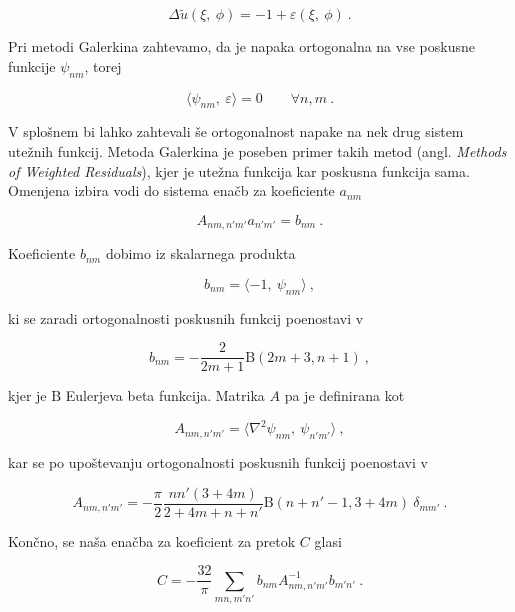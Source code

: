 \documentclass[a4paper]{article}
\begin{document}
\begin{equation}
    \Delta \tilde{u}(\xi,\>\phi) = -1 + \varepsilon(\xi,\>\phi)\>.
\end{equation}

Pri metodi Galerkina zahtevamo, da je napaka ortogonalna na vse poskusne funkcije $\psi_{nm}$, torej

\begin{equation}
    \langle \psi_{nm},\>\varepsilon \rangle = 0 \qquad \forall n,m\>.
\end{equation}

V splošnem bi lahko zahtevali še ortogonalnost napake na nek drug sistem utežnih funkcij. Metoda Galerkina je
poseben primer takih metod (angl. \textit{Methods of Weighted Residuals}), kjer je utežna funkcija kar poskusna
funkcija sama. Omenjena izbira vodi do sistema enačb za koeficiente $a_{nm}$

\begin{equation}
    {A_{nm,n'm'} a_{n'm'}} = b_{nm}\>.
\end{equation}

Koeficiente $b_{nm}$ dobimo iz skalarnega produkta

\begin{equation}
    b_{nm} = \langle -1,\>\psi_{nm} \rangle\>,
\end{equation}

ki se zaradi ortogonalnosti poskusnih funkcij poenostavi v

\begin{equation}
    b_{nm} = - \frac{2}{2m + 1} \mathrm{B}(2m+3, n+1)\>,
\end{equation}

kjer je $\mathrm{B}$ Eulerjeva beta funkcija. Matrika $A$ pa je definirana kot 

\begin{equation}
    A_{nm,n'm'} = \langle \nabla^2\psi_{nm},\>\psi_{n'm'} \rangle\>,
\end{equation}

kar se po upoštevanju ortogonalnosti poskusnih funkcij poenostavi v

\begin{equation}
    A_{nm,n'm'} = -\frac{\pi}{2} \frac{nn'(3+4m)}{2+4m+n+n'} \mathrm{B}(n+n'-1, 3+4m)\>\delta_{mm'}\>.
\end{equation}

Končno, se naša enačba za koeficient za pretok $C$ glasi

\begin{equation}
    C = -\frac{32}{\pi}\sum_{mn,m'n'}{b_{nm}A^{-1}_{nm,n'm'}b_{m'n'}}\>.
    \label{eq:C}
\end{equation}
\end{document}
